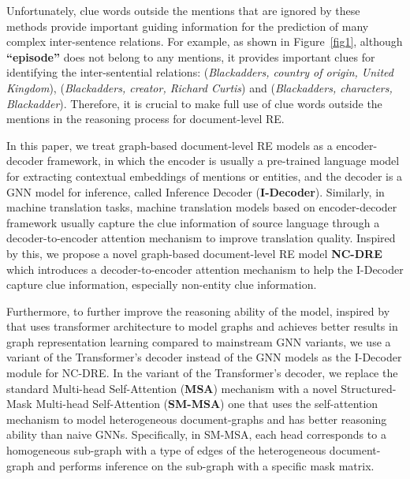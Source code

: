 \documentclass[sigconf,natbib=true]{acmart}
\begin{document}
Unfortunately, clue words outside the mentions that are ignored by these methods provide important guiding information for the prediction of many complex inter-sentence relations.
For example, as shown in Figure~\ref{fig1}, although \textbf{“episode”} does not belong to any mentions, it provides important clues for identifying the inter-sentential relations: (\textit{Blackadders, country of origin, United Kingdom}), (\textit{Blackadders, creator, Richard Curtis}) and (\textit{Blackadders, characters, Blackadder}).
Therefore, it is crucial to make full use of clue words outside the mentions in the reasoning process for document-level RE.

In this paper, we treat graph-based document-level RE models as a encoder-decoder framework, in which the encoder is usually a pre-trained language model for extracting contextual embeddings of mentions or entities, and the decoder is a GNN model for inference, called Inference Decoder (\textbf{I-Decoder}).
Similarly, in machine translation tasks, machine translation models based on encoder-decoder framework usually capture the clue information of source language through a decoder-to-encoder attention mechanism to improve translation quality.
Inspired by this, we propose a novel graph-based document-level RE model \textbf{NC-DRE} which introduces a decoder-to-encoder attention mechanism to help the I-Decoder capture clue information, especially non-entity clue information.

Furthermore, to further improve the reasoning ability of the model, inspired by \cite{c:1} that uses transformer architecture to model graphs and achieves better results in graph representation learning compared
to mainstream GNN variants, we use a variant of the Transformer's decoder \cite{c:151} instead of the GNN models as the I-Decoder module for NC-DRE.
In the variant of the Transformer's decoder, we replace the standard Multi-head Self-Attention (\textbf{MSA}) mechanism with a novel Structured-Mask Multi-head Self-Attention (\textbf{SM-MSA}) one that uses the self-attention mechanism to model heterogeneous document-graphs and has better reasoning ability than naive GNNs.
Specifically, in SM-MSA, each head corresponds to a homogeneous sub-graph with a type of edges of the heterogeneous document-graph and performs inference on the sub-graph with a specific mask matrix.

\end{document}

